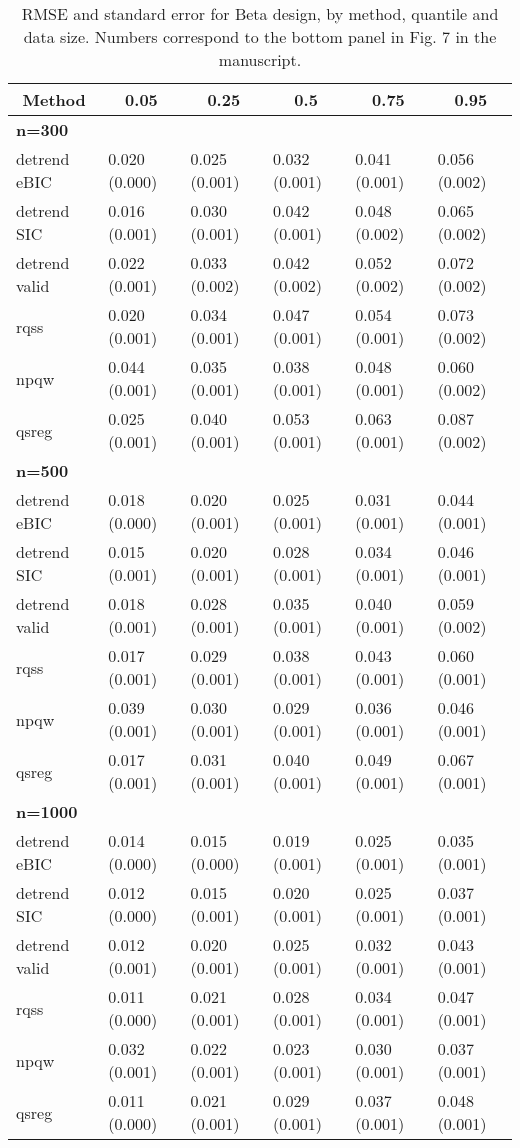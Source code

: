 \documentclass[12pt]{article}
\numberwithin{equation}{section}
\theoremstyle{plain}
\begin{document}
\begin{table}[!tbp]
\begin{center}
	\caption{RMSE and standard error for Beta design, by method, quantile and data size. Numbers correspond to the bottom panel in Fig. 7 in the manuscript.}
\begin{tabular}{llllll}
\hline\hline
\multicolumn{1}{c}{Method}&\multicolumn{1}{c}{0.05}&\multicolumn{1}{c}{0.25}&\multicolumn{1}{c}{0.5}&\multicolumn{1}{c}{0.75}&\multicolumn{1}{c}{0.95}\tabularnewline
\hline
{\bfseries n=300}&&&&&\tabularnewline
detrend eBIC&0.020 (0.000)&0.025 (0.001)&0.032 (0.001)&0.041 (0.001)&0.056 (0.002)\tabularnewline
detrend SIC&0.016 (0.001)&0.030 (0.001)&0.042 (0.001)&0.048 (0.002)&0.065 (0.002)\tabularnewline
detrend valid&0.022 (0.001)&0.033 (0.002)&0.042 (0.002)&0.052 (0.002)&0.072 (0.002)\tabularnewline
rqss&0.020 (0.001)&0.034 (0.001)&0.047 (0.001)&0.054 (0.001)&0.073 (0.002)\tabularnewline
npqw&0.044 (0.001)&0.035 (0.001)&0.038 (0.001)&0.048 (0.001)&0.060 (0.002)\tabularnewline
qsreg&0.025 (0.001)&0.040 (0.001)&0.053 (0.001)&0.063 (0.001)&0.087 (0.002)\tabularnewline
\hline
{\bfseries n=500}&&&&&\tabularnewline
detrend eBIC&0.018 (0.000)&0.020 (0.001)&0.025 (0.001)&0.031 (0.001)&0.044 (0.001)\tabularnewline
detrend SIC&0.015 (0.001)&0.020 (0.001)&0.028 (0.001)&0.034 (0.001)&0.046 (0.001)\tabularnewline
detrend valid&0.018 (0.001)&0.028 (0.001)&0.035 (0.001)&0.040 (0.001)&0.059 (0.002)\tabularnewline
rqss&0.017 (0.001)&0.029 (0.001)&0.038 (0.001)&0.043 (0.001)&0.060 (0.001)\tabularnewline
npqw&0.039 (0.001)&0.030 (0.001)&0.029 (0.001)&0.036 (0.001)&0.046 (0.001)\tabularnewline
qsreg&0.017 (0.001)&0.031 (0.001)&0.040 (0.001)&0.049 (0.001)&0.067 (0.001)\tabularnewline
\hline
{\bfseries n=1000}&&&&&\tabularnewline
detrend eBIC&0.014 (0.000)&0.015 (0.000)&0.019 (0.001)&0.025 (0.001)&0.035 (0.001)\tabularnewline
detrend SIC&0.012 (0.000)&0.015 (0.001)&0.020 (0.001)&0.025 (0.001)&0.037 (0.001)\tabularnewline
detrend valid&0.012 (0.001)&0.020 (0.001)&0.025 (0.001)&0.032 (0.001)&0.043 (0.001)\tabularnewline
rqss&0.011 (0.000)&0.021 (0.001)&0.028 (0.001)&0.034 (0.001)&0.047 (0.001)\tabularnewline
npqw&0.032 (0.001)&0.022 (0.001)&0.023 (0.001)&0.030 (0.001)&0.037 (0.001)\tabularnewline
qsreg&0.011 (0.000)&0.021 (0.001)&0.029 (0.001)&0.037 (0.001)&0.048 (0.001)\tabularnewline
\hline
\end{tabular}\end{center}
\end{table}
\end{document}
